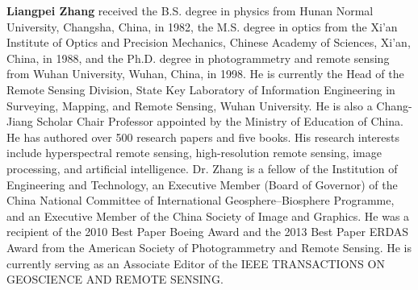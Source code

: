 \documentclass[a4paper]{article}
\begin{document}
\noindent\textbf{Liangpei Zhang} received the B.S.
degree in physics from Hunan Normal University,
Changsha, China, in 1982, the M.S. degree in optics
from the Xi’an Institute of Optics and Precision
Mechanics, Chinese Academy of Sciences, Xi’an,
China, in 1988, and the Ph.D. degree in photogrammetry
and remote sensing from Wuhan University,
Wuhan, China, in 1998. He is currently the
Head of the Remote Sensing Division, State Key Laboratory of Information
Engineering in Surveying, Mapping, and Remote Sensing, Wuhan University.
He is also a Chang-Jiang Scholar Chair Professor appointed by the Ministry of
Education of China. He has authored over 500 research papers and five books. His research interests include hyperspectral remote
sensing, high-resolution remote sensing, image processing, and artificial
intelligence.
Dr. Zhang is a fellow of the Institution of Engineering and Technology, an
Executive Member (Board of Governor) of the China National Committee of
International Geosphere–Biosphere Programme, and an Executive Member of
the China Society of Image and Graphics. He was
a recipient of the 2010 Best Paper Boeing Award and the 2013 Best Paper
ERDAS Award from the American Society of Photogrammetry and Remote
Sensing. He is currently
serving as an Associate Editor of the IEEE TRANSACTIONS ON GEOSCIENCE
AND REMOTE SENSING.

{\small

%

}
\end{document}
